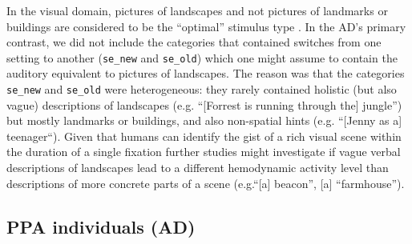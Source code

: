 \documentclass[english]{article}
\begin{document}

In the visual domain, pictures of landscapes and not pictures of landmarks or
buildings are considered to be the ``optimal'' stimulus type
\citep{epstein2008parahippocampal}.
In the AD's primary contrast, we did not include the categories that contained
switches from one setting to another (\texttt{se\_new} and \texttt{se\_old})
which one might assume to contain the auditory equivalent to pictures of
landscapes.
The reason was that the categories \texttt{se\_new} and \texttt{se\_old} were
heterogeneous: they rarely contained holistic (but also vague) descriptions of
landscapes (e.g.  ``[Forrest is running through the] jungle'') but mostly
landmarks or buildings, and also non-spatial hints (e.g. ``[Jenny as a]
teenager``).
Given that humans can identify the gist of a rich visual scene within the
duration of a single fixation \citep{henderson2003human} further studies might
investigate if vague verbal descriptions of landscapes lead to a different
hemodynamic activity level than descriptions of more concrete parts of a scene
(e.g.``[a] beacon'', [a] ``farmhouse'').


\subsection{PPA individuals (AD)}
\end{document}

